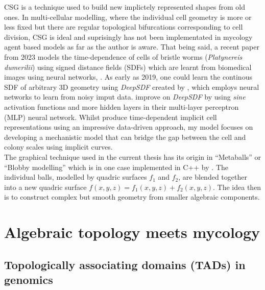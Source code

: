 CSG is a technique used to build new implictely represented shapes from old ones.
In multi-cellular modelling, where the individual cell geometry 
is more or less fixed but there 
are regular topological bifurcations corresponding to cell division,
CSG is ideal and suprisingly has not been implementated in mycology agent 
based models as far as the author is aware.
That being said, a recent paper from 2023 models the time-dependence of cells of bristle 
worms (\textit{Platynereis dumerilii}) using signed distance fields (SDFs) which 
are learnt from biomedical images using neural networks, \cite{wiesner2024generative}.
As early as 2019, one could learn the continous SDF of arbitrary 3D geometry using 
\textit{DeepSDF} created by \cite{park2019deepsdf}, which employs neural networks
to learn from noisy imput data. \cite{wiesner2024generative} improve 
on \textit{DeepSDF} by using \textit{sine} activation functions and 
more hidden layers in their multi-layer perceptron (MLP) neural network. Whilst 
\cite{wiesner2024generative} produce time-dependent implicit cell representations using 
an impressive data-driven approach, my model focuses on developing 
a mechanistic model that can bridge the gap between the cell and colony scales using 
implicit curves.
\\

The graphical technique used in the current thesis has its origin in ``Metaballs'' or 
``Blobby modelling'' which is in one case
implemented in C++ by \cite{kommareddy20143d}. The individual balls, 
modelled by quadric surfaces $f_1$ and $f_2$, are blended together 
into a new quadric surface $f(x,y,z) = f_1(x,y,z) + f_2(x,y,z)$. The idea then 
is to construct complex but smooth geometry from smaller algebraic components.
\\

\section{Algebraic topology meets mycology}

\subsection{Topologically associating domains (TADs) in genomics}

